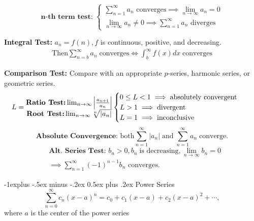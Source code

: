\documentclass[10pt]{article}
\makeatletter
\renewcommand{\subsection}{\@startsection{subsection}{2}{0mm}%
                                {-1explus -.5ex minus -.2ex}%
                                {0.5ex plus .2ex}%
                                {\normalfont\normalsize\bfseries}}
\makeatother
\begin{document}
\begin{multicols}{2}
\[
\textbf{n-th term test: } \begin{cases}
    \sum^{\infty}_{n=1}a_n \text{ converges} \implies \lim_{n \to \infty} a_n = 0 \\
    \lim_{n \to \infty} a_n \neq 0 \implies \sum^{\infty}_{n=1}a_n \text{ diverges}
\end{cases}
\]

\textbf{Integral Test:} $a_n = f(n), f$ is continuous, positive, and decreasing.
\begin{align*}
    \text{Then} \sum_{n=b}^{\infty} a_n \; \text{converges} \iff \int_{b}^{\infty} f(x) dx \; \text{converges}
\end{align*}

\textbf{Comparison Test:} Compare with an appropriate $p$-series, harmonic series, or geometric series.
\begin{align*}
    & L = \begin{matrix}
        \textbf{Ratio Test:} \lim_{n\to\infty}\abs{\frac{a_{n+1}}{a_n}} \\
        \textbf{Root Test:} \lim_{n\to\infty}\sqrt[n]{|a_n|} \\
    \end{matrix} \begin{cases}
        0 \leq L < 1 \implies \text{absolutely convergent} \\
        L > 1 \implies \text{divergent} \\
        L = 1 \implies \text{inconclusive}
    \end{cases}
\end{align*}
\[\textbf{Absolute Convergence: } \text{both} \sum^{\infty}_{n=1}|a_n| \; \text{and} \;  \sum^{\infty}_{n=1}a_n \; \text{converge.}\]
\begin{align*}
    & \textbf{Alt. Series Test: } b_n >0, b_n \; \text{is decreasing}, \lim_{n\to\infty}b_n = 0 \\
    & \implies \sum_{n=1}^{\infty}(-1)^{n-1}b_n \text{ converges.}
\end{align*}


\subsection{Power Series}
\[\sum_{n = 0}^{\infty} c_n(x-a)^n = c_0 + c_1(x-a) + c_2(x-a)^2 + \cdots,\]
where $a$ is the center of the power series \\ 



\end{multicols}
\end{document}
